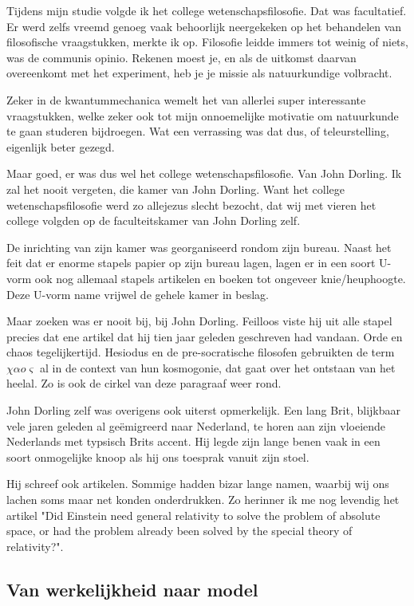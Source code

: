 \documentclass{article}      %
\begin{document}
Tijdens mijn studie volgde ik het college wetenschapsfilosofie. Dat was 
facultatief. Er werd zelfs vreemd genoeg vaak behoorlijk neergekeken op
het behandelen van filosofische vraagstukken, merkte ik op. Filosofie leidde
immers tot weinig of niets, was de communis opinio. Rekenen moest je, en als
de uitkomst daarvan overeenkomt met het experiment, heb je je missie als 
natuurkundige volbracht.

Zeker in de kwantummechanica wemelt het van allerlei super interessante 
vraagstukken, welke zeker ook tot mijn onnoemelijke motivatie om natuurkunde
te gaan studeren bijdroegen. Wat een verrassing was dat dus, of teleurstelling, 
eigenlijk beter gezegd.

Maar goed, er was dus wel het college wetenschapsfilosofie. Van John Dorling. 
Ik zal het nooit vergeten, die kamer van John Dorling. Want het college 
wetenschapsfilosofie werd zo allejezus slecht bezocht, dat wij met vieren
het college volgden op de faculteitskamer van John Dorling zelf.

De inrichting van zijn kamer was georganiseerd rondom zijn bureau. Naast het 
feit dat er enorme stapels papier op zijn bureau lagen, lagen er in een 
soort U-vorm ook nog allemaal stapels artikelen en boeken tot ongeveer 
knie/heuphoogte. Deze U-vorm name vrijwel de gehele kamer in beslag.

Maar zoeken was er nooit bij, bij John Dorling. Feilloos viste hij uit 
alle stapel precies dat ene artikel dat hij tien jaar geleden geschreven
had vandaan. Orde en chaos tegelijkertijd. Hesiodus en de pre-socratische 
filosofen gebruikten de term $\chi\alpha o\varsigma$
al in de context van hun kosmogonie, dat gaat over het ontstaan van het heelal. 
Zo is ook de cirkel van deze paragraaf weer rond.

John Dorling zelf was overigens ook uiterst opmerkelijk. Een lang Brit, 
blijkbaar vele jaren geleden al geëmigreerd naar Nederland, te horen aan  
zijn vloeiende Nederlands met typsisch Brits accent. Hij legde zijn lange benen 
vaak in een soort onmogelijke knoop als hij ons toesprak vanuit zijn stoel. 

Hij schreef ook artikelen. Sommige hadden bizar lange namen, waarbij wij ons 
lachen soms maar net konden onderdrukken. Zo herinner ik me nog levendig het 
artikel "Did Einstein need general relativity to solve the problem of 
absolute space, or had the problem already been solved by the special theory 
of relativity?".

\subsection{Van werkelijkheid naar model}
\end{document}
